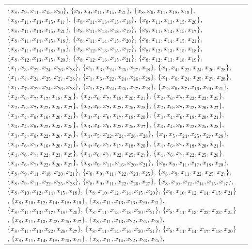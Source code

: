 \begin{tabular}{l >{\raggedright\arraybackslash}p{9.5cm}}
$\{x_{8},x_{9},x_{11},x_{15},x_{20}\}$, $\{x_{8},x_{9},x_{11},x_{15},x_{21}\}$, $\{x_{8},x_{9},x_{11},x_{18},x_{19}\}$, $\{x_{8},x_{11},x_{13},x_{15},x_{17}\}$, $\{x_{8},x_{11},x_{13},x_{15},x_{18}\}$, $\{x_{8},x_{11},x_{13},x_{15},x_{20}\}$, $\{x_{8},x_{11},x_{13},x_{15},x_{21}\}$, $\{x_{8},x_{11},x_{13},x_{18},x_{19}\}$, $\{x_{8},x_{11},x_{14},x_{15},x_{17}\}$, $\{x_{8},x_{11},x_{14},x_{15},x_{18}\}$, $\{x_{8},x_{11},x_{14},x_{15},x_{20}\}$, $\{x_{8},x_{11},x_{14},x_{15},x_{21}\}$, $\{x_{8},x_{11},x_{14},x_{18},x_{19}\}$, $\{x_{8},x_{12},x_{13},x_{15},x_{17}\}$, $\{x_{8},x_{12},x_{13},x_{15},x_{18}\}$, $\{x_{8},x_{12},x_{13},x_{15},x_{20}\}$, $\{x_{8},x_{12},x_{13},x_{15},x_{21}\}$, $\{x_{8},x_{12},x_{13},x_{18},x_{19}\}$, $\{x_{1},x_{3},x_{22},x_{24},x_{26},x_{28}\}$, $\{x_{1},x_{3},x_{24},x_{25},x_{27},x_{28}\}$, $\{x_{1},x_{4},x_{22},x_{24},x_{26},x_{28}\}$, $\{x_{1},x_{4},x_{24},x_{25},x_{27},x_{28}\}$, $\{x_{1},x_{6},x_{22},x_{24},x_{26},x_{28}\}$, $\{x_{1},x_{6},x_{24},x_{25},x_{27},x_{28}\}$, $\{x_{1},x_{7},x_{22},x_{24},x_{26},x_{28}\}$, $\{x_{1},x_{7},x_{24},x_{25},x_{27},x_{28}\}$, $\{x_{2},x_{6},x_{7},x_{16},x_{20},x_{21}\}$, $\{x_{2},x_{6},x_{7},x_{17},x_{18},x_{20}\}$, $\{x_{2},x_{6},x_{7},x_{18},x_{20},x_{21}\}$, $\{x_{2},x_{6},x_{7},x_{22},x_{23},x_{25}\}$, $\{x_{2},x_{6},x_{7},x_{22},x_{25},x_{27}\}$, $\{x_{2},x_{6},x_{7},x_{22},x_{25},x_{28}\}$, $\{x_{2},x_{6},x_{7},x_{22},x_{26},x_{27}\}$, $\{x_{3},x_{4},x_{6},x_{16},x_{20},x_{21}\}$, $\{x_{3},x_{4},x_{6},x_{17},x_{18},x_{20}\}$, $\{x_{3},x_{4},x_{6},x_{18},x_{20},x_{21}\}$, $\{x_{3},x_{4},x_{6},x_{22},x_{23},x_{25}\}$, $\{x_{3},x_{4},x_{6},x_{22},x_{25},x_{27}\}$, $\{x_{3},x_{4},x_{6},x_{22},x_{25},x_{28}\}$, $\{x_{3},x_{4},x_{6},x_{22},x_{26},x_{27}\}$, $\{x_{4},x_{5},x_{22},x_{24},x_{26},x_{28}\}$, $\{x_{4},x_{5},x_{24},x_{25},x_{27},x_{28}\}$, $\{x_{4},x_{6},x_{7},x_{16},x_{20},x_{21}\}$, $\{x_{4},x_{6},x_{7},x_{17},x_{18},x_{20}\}$, $\{x_{4},x_{6},x_{7},x_{18},x_{20},x_{21}\}$, $\{x_{4},x_{6},x_{7},x_{22},x_{23},x_{25}\}$, $\{x_{4},x_{6},x_{7},x_{22},x_{25},x_{27}\}$, $\{x_{4},x_{6},x_{7},x_{22},x_{25},x_{28}\}$, $\{x_{4},x_{6},x_{7},x_{22},x_{26},x_{27}\}$, $\{x_{8},x_{9},x_{11},x_{16},x_{20},x_{21}\}$, $\{x_{8},x_{9},x_{11},x_{17},x_{18},x_{20}\}$, $\{x_{8},x_{9},x_{11},x_{18},x_{20},x_{21}\}$, $\{x_{8},x_{9},x_{11},x_{22},x_{23},x_{25}\}$, $\{x_{8},x_{9},x_{11},x_{22},x_{25},x_{27}\}$, $\{x_{8},x_{9},x_{11},x_{22},x_{25},x_{28}\}$, $\{x_{8},x_{9},x_{11},x_{22},x_{26},x_{27}\}$, $\{x_{8},x_{10},x_{12},x_{14},x_{15},x_{17}\}$, $\{x_{8},x_{10},x_{12},x_{14},x_{15},x_{18}\}$, $\{x_{8},x_{10},x_{12},x_{14},x_{15},x_{20}\}$, $\{x_{8},x_{10},x_{12},x_{14},x_{15},x_{21}\}$, $\{x_{8},x_{10},x_{12},x_{14},x_{18},x_{19}\}$, $\{x_{8},x_{11},x_{13},x_{16},x_{20},x_{21}\}$, $\{x_{8},x_{11},x_{13},x_{17},x_{18},x_{20}\}$, $\{x_{8},x_{11},x_{13},x_{18},x_{20},x_{21}\}$, $\{x_{8},x_{11},x_{13},x_{22},x_{23},x_{25}\}$, $\{x_{8},x_{11},x_{13},x_{22},x_{25},x_{27}\}$, $\{x_{8},x_{11},x_{13},x_{22},x_{25},x_{28}\}$, $\{x_{8},x_{11},x_{13},x_{22},x_{26},x_{27}\}$, $\{x_{8},x_{11},x_{14},x_{16},x_{20},x_{21}\}$, $\{x_{8},x_{11},x_{14},x_{17},x_{18},x_{20}\}$, $\{x_{8},x_{11},x_{14},x_{18},x_{20},x_{21}\}$, $\{x_{8},x_{11},x_{14},x_{22},x_{23},x_{25}\}$, 
\end{tabular}
